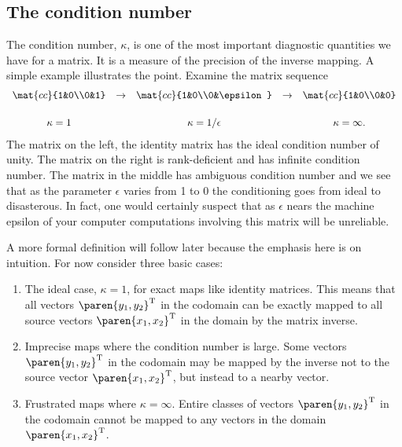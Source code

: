 \subsection{The condition number}
The condition number, $\kappa$, is one of the most important diagnostic quantities we have for a matrix. It is a measure of the precision of the inverse mapping. A simple example illustrates the point. Examine the matrix sequence
\begin{equation}
\begin{array}{ccccc}
  \mat{cc}{1&0\\0&1} & \to & \mat{cc}{1&0\\0&\epsilon} & \to & \mat{cc}{1&0\\0&0}\\[15pt]
  \kappa = 1 && \kappa = 1/\epsilon && \kappa = \infty.
\end{array}
\end{equation}
The matrix on the left, the identity matrix has the ideal condition number of unity. The matrix on the right is rank-deficient and has infinite condition number. The matrix in the middle has ambiguous condition number and we see that as the parameter $\epsilon$ varies from 1 to 0 the conditioning goes from ideal to disasterous. In fact, one would certainly suspect that as $\epsilon$ nears the machine epsilon of your computer computations involving this matrix will be unreliable.

A more formal definition will follow later because the emphasis here is on intuition. For now consider three basic cases:
\begin{enumerate}
\item The ideal case, $\kappa=1$, for exact maps like identity matrices. This means that all vectors $\paren{y_{1},y_{2}}^{\mathrm{T}}$ in the codomain  can be exactly mapped to all source vectors $\paren{x_{1},x_{2}}^{\mathrm{T}}$ in the domain by the matrix inverse.
\item Imprecise maps where the condition number is large. Some vectors $\paren{y_{1},y_{2}}^{\mathrm{T}}$ in the codomain may be mapped by the inverse not to the source vector $\paren{x_{1},x_{2}}^{\mathrm{T}}$, but instead to a nearby vector.
\item Frustrated maps where $\kappa=\infty$. Entire classes of vectors $\paren{y_{1},y_{2}}^{\mathrm{T}}$ in the codomain cannot be mapped to any vectors in the domain $\paren{x_{1},x_{2}}^{\mathrm{T}}$.
\end{enumerate}

